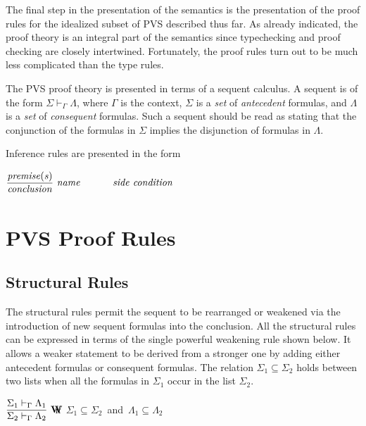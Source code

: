 \documentclass [12pt,twoside]{cslreport}
\newcommand{\Infrule}[3]{
{{\displaystyle\strut #1}\over{\displaystyle\strut #2}}\qquad\makebox[0pt][l]{\it #3}
}
\begin{document}
The final step in the presentation of the semantics is the presentation of
the proof rules for the idealized subset of PVS described thus far.
As already indicated, the proof theory is an integral part of the
semantics since typechecking and proof checking are closely intertwined.
Fortunately, the proof rules turn out to be much less complicated than the
type rules.

\newcommand{\sequent}[3]{#1\vdash_{#2}#3}

The PVS proof theory is presented in terms of  a sequent calculus.  A
sequent is of the form 
$\sequent{\Sigma}{\Gamma}{\Lambda}$, where $\Gamma$ is the context,
$\Sigma$ is a {\em set\/} of {\em antecedent\/} formulas, and $\Lambda$ 
is a {\em set\/} of {\em consequent\/} formulas.  Such a sequent should
be read as stating that the conjunction of the formulas in $\Sigma$ implies the
disjunction of formulas in $\Lambda$\@.

\renewcommand{\Infrule}[3]{
{{\displaystyle\strut #1}\over{\displaystyle\strut #2}}~\makebox[0pt][l]{{$\mathbf{ #3}$}}
}

Inference rules are presented in the form
\begin{center}
$\Infrule{\mathit{premise(s)}}{\mathit{conclusion}}{\mathit{name}}\hspace{2cm}
\mathit{side\ condition}$
\end{center}


\section{PVS Proof Rules} 

\subsection{Structural Rules}

The structural rules permit the sequent to be rearranged or weakened
via the introduction of new sequent formulas into the conclusion.  
All the structural rules can be expressed in terms of the single
powerful weakening rule  shown below.
It allows a weaker statement to
be derived from a stronger one by adding either antecedent formulas or
consequent formulas.  The relation $\Sigma_1\subseteq\Sigma_2$ holds
between two lists when all the formulas in $\Sigma_1$ occur in the list
$\Sigma_2$.  

\begin{center}
$\Infrule{\sequent{\Sigma_1}{\Gamma}{\Lambda_1}}
         {\sequent{\Sigma_2}{\Gamma}{\Lambda_2}} {W}$
\hspace{1cm}\mbox{\smaller\smaller if $\Sigma_1\subseteq\Sigma_2$ and $\Lambda_1\subseteq\Lambda_2$}
\end{center}
\end{document}
